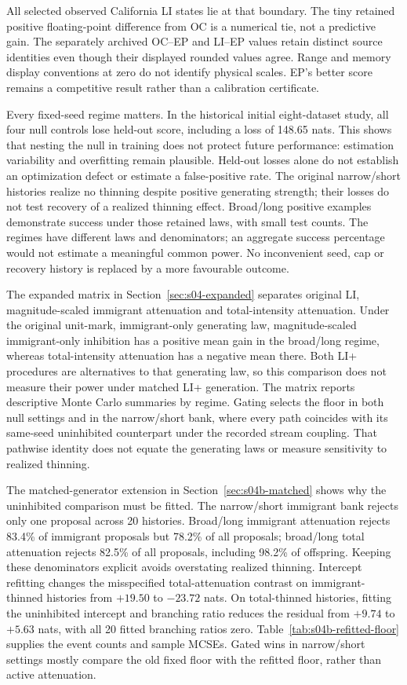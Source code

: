 All selected observed California LI states lie at that boundary. The tiny retained positive floating-point difference from OC is a numerical tie, not a predictive gain. The separately archived OC--EP and LI--EP values retain distinct source identities even though their displayed rounded values agree. Range and memory display conventions at zero do not identify physical scales. EP's better score remains a competitive result rather than a calibration certificate.

Every fixed-seed regime matters. In the historical initial eight-dataset study, all four null controls lose held-out score, including a loss of 148.65 nats. This shows that nesting the null in training does not protect future performance: estimation variability and overfitting remain plausible. Held-out losses alone do not establish an optimization defect or estimate a false-positive rate. The original narrow/short histories realize no thinning despite positive generating strength; their losses do not test recovery of a realized thinning effect. Broad/long positive examples demonstrate success under those retained laws, with small test counts. The regimes have different laws and denominators; an aggregate success percentage would not estimate a meaningful common power. No inconvenient seed, cap or recovery history is replaced by a more favourable outcome.

The expanded matrix in Section~\ref{sec:s04-expanded} separates original LI, magnitude-scaled immigrant attenuation and total-intensity attenuation. Under the original unit-mark, immigrant-only generating law, magnitude-scaled immigrant-only inhibition has a positive mean gain in the broad/long regime, whereas total-intensity attenuation has a negative mean there. Both LI+ procedures are alternatives to that generating law, so this comparison does not measure their power under matched LI+ generation. The matrix reports descriptive Monte Carlo summaries by regime. Gating selects the floor in both null settings and in the narrow/short bank, where every path coincides with its same-seed uninhibited counterpart under the recorded stream coupling. That pathwise identity does not equate the generating laws or measure sensitivity to realized thinning.

The matched-generator extension in Section~\ref{sec:s04b-matched} shows why the uninhibited comparison must be fitted. The narrow/short immigrant bank rejects only one proposal across 20 histories. Broad/long immigrant attenuation rejects 83.4\% of immigrant proposals but 78.2\% of all proposals; broad/long total attenuation rejects 82.5\% of all proposals, including 98.2\% of offspring. Keeping these denominators explicit avoids overstating realized thinning. Intercept refitting changes the misspecified total-attenuation contrast on immigrant-thinned histories from $+19.50$ to $-23.72$ nats. On total-thinned histories, fitting the uninhibited intercept and branching ratio reduces the residual from $+9.74$ to $+5.63$ nats, with all 20 fitted branching ratios zero. Table~\ref{tab:s04b-refitted-floor} supplies the event counts and sample MCSEs. Gated wins in narrow/short settings mostly compare the old fixed floor with the refitted floor, rather than active attenuation.

